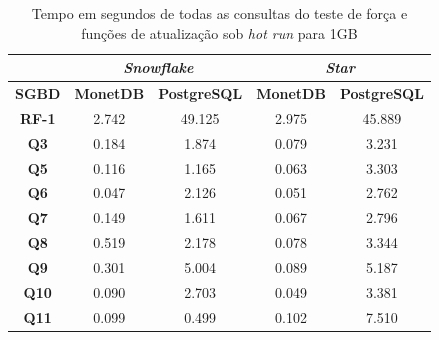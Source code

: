 \begin{table}[t]
        \centering
        \caption{Tempo em segundos de todas as consultas do teste de força e funções de atualização sob \textit{hot run} para 1GB}
        \label{tab:queries_hot_1}
        \begin{tabular}{|c|c|c|c|c|} 
                \cline{2-5}
                \multicolumn{1}{c|}{} & \multicolumn{2}{c|}{\textit{\textbf{Snowflake}} } & \multicolumn{2}{c|}{\textit{\textbf{Star}} }  \\ 
                \hline
                 \textbf{SGBD}        & \textbf{MonetDB}  & \textbf{PostgreSQL}           & \textbf{MonetDB}  & \textbf{PostgreSQL}       \\ 
                \hline
                 \textbf{RF-1}        & 2.742             & 49.125                        & 2.975             & 45.889                    \\ 
                \hline
                 \textbf{Q3}          & 0.184             & 1.874                         & 0.079             & 3.231                     \\ 
                \hline
                 \textbf{Q5}          & 0.116             & 1.165                         & 0.063             & 3.303                     \\ 
                \hline
                 \textbf{Q6}          & 0.047             & 2.126                         & 0.051             & 2.762                     \\ 
                \hline
                 \textbf{Q7}          & 0.149             & 1.611                         & 0.067             & 2.796                     \\ 
                \hline
                 \textbf{Q8}          & 0.519             & 2.178                         & 0.078             & 3.344                     \\ 
                \hline
                 \textbf{Q9}          & 0.301             & 5.004                         & 0.089             & 5.187                     \\ 
                \hline
                 \textbf{Q10}         & 0.090             & 2.703                         & 0.049             & 3.381                     \\ 
                \hline
                 \textbf{Q11}         & 0.099             & 0.499                         & 0.102             & 7.510                     \\ 

\end{tabular}
\end{table}
